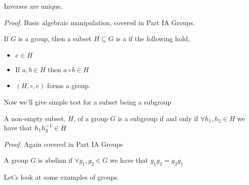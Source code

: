 \documentclass{article}
\begin{document}
\begin{proposition}
  Inverses are unique.
\end{proposition}
\textit{Proof.} Basic algebraic manipulation, covered in Part IA Groups.
\begin{definition}
	If $ G $ is a group, then a subset $ H\subseteq G $ is a  if the following hold,
\begin{itemize}
	\item $ e\in H $
	\item If $ a,b\in H $ then $ a\circ b\in H $
\item $ (H,\circ, e) $ forms a group.
\end{itemize}
\end{definition}
Now we'll give simple test for a subset being a subgroup
\begin{lemma}
  A non-empty subset, $ H $, of a group $ G $ is a subgroup if and only if $ \forall h_1,h_2\in H $ we have that $ h_1 {h}^{-1}_2\in H $
\end{lemma}
\textit{Proof.} Again covered in Part IA Groups
\begin{definition}
  A group $ G $ is abelian if $ \forall g_1,g_2\in G $ we have that $ g_1g_2=g_2g_1 $
\end{definition}
Let's look at some examples of groups.
\end{document}
